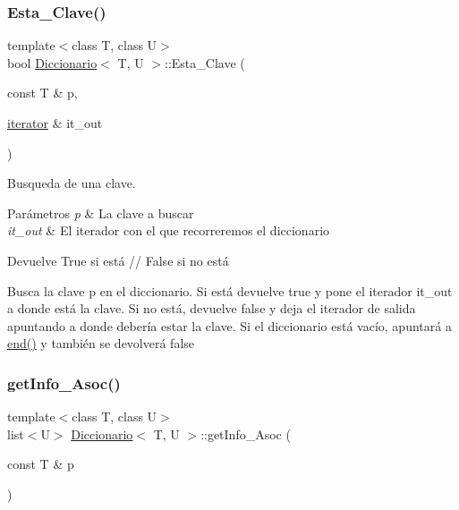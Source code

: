 \subsubsection{\texorpdfstring{Esta\+\_\+\+Clave()}{Esta\_Clave()}}
{\footnotesize\ttfamily template$<$class T, class U$>$ \\
bool \hyperlink{classDiccionario}{Diccionario}$<$ T, U $>$\+::Esta\+\_\+\+Clave (\begin{DoxyParamCaption}\item[{const T \&}]{p,  }\item[{\hyperlink{classDiccionario_1_1iterator}{iterator} \&}]{it\+\_\+out }\end{DoxyParamCaption})\hspace{0.3cm}{\ttfamily [inline]}}



Busqueda de una clave. 


\begin{DoxyParams}{Parámetros}
{\em p} & La clave a buscar \\
\hline
{\em it\+\_\+out} & El iterador con el que recorreremos el diccionario\\
\hline
\end{DoxyParams}
\begin{DoxyReturn}{Devuelve}
True si está // False si no está
\end{DoxyReturn}
Busca la clave p en el diccionario. Si está devuelve true y pone el iterador it\+\_\+out a donde está la clave. Si no está, devuelve false y deja el iterador de salida apuntando a donde debería estar la clave. Si el diccionario está vacío, apuntará a \hyperlink{classDiccionario_adb5cdbfce59b4005bd07473273df3a8e}{end()} y también se devolverá false \mbox{\label{classDiccionario_ad262cd8d8e11286beecfa4851ec2c948}} 
\subsubsection{\texorpdfstring{get\+Info\+\_\+\+Asoc()}{getInfo\_Asoc()}}
{\footnotesize\ttfamily template$<$class T, class U$>$ \\
list$<$U$>$ \hyperlink{classDiccionario}{Diccionario}$<$ T, U $>$\+::get\+Info\+\_\+\+Asoc (\begin{DoxyParamCaption}\item[{const T \&}]{p }\end{DoxyParamCaption})\hspace{0.3cm}{\ttfamily [inline]}}



